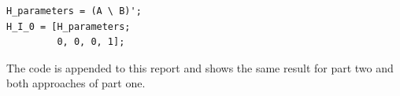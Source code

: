 \documentclass[12pt, a4paper]{article}
\begin{document}
\begin{lstlisting}
H_parameters = (A \ B)';
H_I_0 = [H_parameters; 
         0, 0, 0, 1];
\end{lstlisting}

The code is appended to this report and shows the same result for part two and both approaches of part one.

\end{document}
